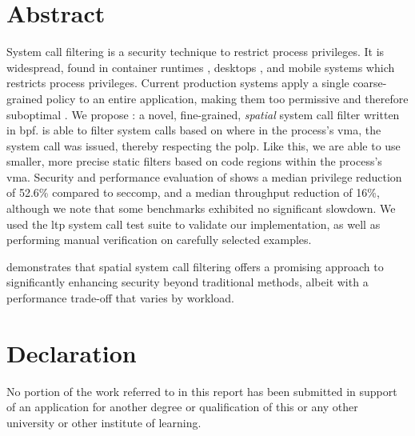\section*{Abstract}



System call filtering is a security technique to restrict process
privileges. It is widespread, found in container runtimes 
\cite{docker_seccomp}, desktops \cite{chromium_sandboxing,
firefox_seccomp}, and mobile systems \cite{android_seccomp_oreo} which
restricts process privileges. Current
production systems apply a single coarse-grained policy to
an entire application, making them too permissive and therefore suboptimal
\cite{OPTIMUS}. 
We propose \af: a novel, fine-grained, \textit{spatial} system call filter
written in \ac{bpf}. \af is able to filter system calls based on  where in
the process's \ac{vma}, the system call was issued, thereby respecting the 
\ac{polp}\cite{SALTZER_SCHROEDER}. Like this, we are able to use smaller, 
more precise static filters based on code regions within the process's \ac{vma}.
Security and performance evaluation of \af shows a median
privilege
reduction of 52.6\% compared to seccomp, and a median throughput reduction
of 16\%, although we note that some benchmarks exhibited no significant
slowdown. We used the \ac{ltp} system call test suite to validate our
implementation, as well as performing manual verification on carefully
selected examples.

\af demonstrates that spatial system call filtering offers a promising
approach to significantly enhancing security beyond traditional methods, albeit
with a performance trade-off that varies by workload.

\clearpage

\section*{Declaration}

No portion of the work referred to in this report has been
submitted in support of an application for another degree or
qualification of this or any other university or other institute
of learning.

\clearpage

